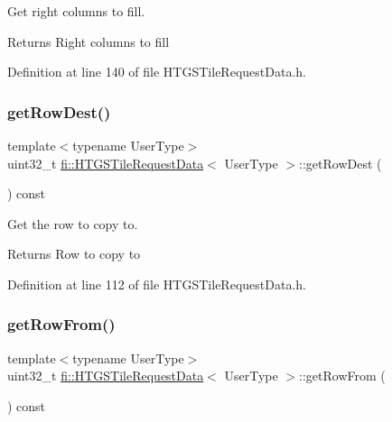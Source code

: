 Get right columns to fill. 

\begin{DoxyReturn}{Returns}
Right columns to fill 
\end{DoxyReturn}


Definition at line 140 of file H\+T\+G\+S\+Tile\+Request\+Data.\+h.

\mbox{\label{classfi_1_1HTGSTileRequestData_a7c40952f65f5364af8fb449e27eb92ca}} 
\subsubsection{\texorpdfstring{get\+Row\+Dest()}{getRowDest()}}
{\footnotesize\ttfamily template$<$typename User\+Type$>$ \\
uint32\+\_\+t \hyperlink{classfi_1_1HTGSTileRequestData}{fi\+::\+H\+T\+G\+S\+Tile\+Request\+Data}$<$ User\+Type $>$\+::get\+Row\+Dest (\begin{DoxyParamCaption}{ }\end{DoxyParamCaption}) const\hspace{0.3cm}{\ttfamily [inline]}}



Get the row to copy to. 

\begin{DoxyReturn}{Returns}
Row to copy to 
\end{DoxyReturn}


Definition at line 112 of file H\+T\+G\+S\+Tile\+Request\+Data.\+h.

\mbox{\label{classfi_1_1HTGSTileRequestData_a2d963b7535bf552ed591c83a9d2b5c98}} 
\subsubsection{\texorpdfstring{get\+Row\+From()}{getRowFrom()}}
{\footnotesize\ttfamily template$<$typename User\+Type$>$ \\
uint32\+\_\+t \hyperlink{classfi_1_1HTGSTileRequestData}{fi\+::\+H\+T\+G\+S\+Tile\+Request\+Data}$<$ User\+Type $>$\+::get\+Row\+From (\begin{DoxyParamCaption}{ }\end{DoxyParamCaption}) const\hspace{0.3cm}{\ttfamily [inline]}}



